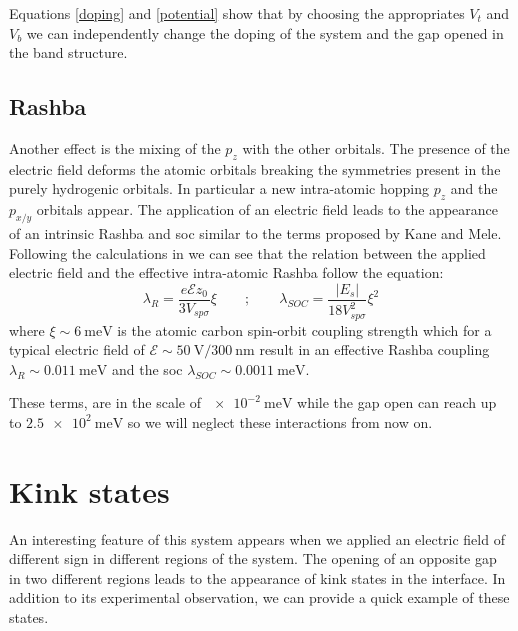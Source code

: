 Equations \eqref{doping} and \eqref{potential} show that by choosing the        appropriates $V_t$ and $V_b$ we can independently change the doping of the      system and the gap opened in the band structure.





\subsection{Rashba}
Another effect is the mixing of the $p_z$ with the other orbitals. The presence of the electric field deforms the atomic orbitals breaking the symmetries present in the purely hydrogenic orbitals. In particular a new intra-atomic hopping $p_z$ and the $p_{x/y}$ orbitals appear. The application of an electric field leads to the appearance of an intrinsic Rashba and \ac{soc} similar to the terms proposed by Kane and Mele\cite{Kane2005}.
Following the calculations in %
\cite{Min2006} we can see that the relation between the applied electric field and the effective intra-atomic Rashba follow the equation:
\begin{equation}
   \lambda_R=\frac{e\mathcal{E}z_0}{3V_{sp\sigma}}\xi \qquad;\qquad
   \lambda_{SOC}=\frac{|E_{s}|}{18V^2_{sp\sigma}}\xi^2
\label{rashba}
\end{equation}
where $\xi\sim\SI{6}{\meV}$ is the atomic carbon spin-orbit coupling strength
which for a typical electric field of $\mathcal{E}\sim\SI{50}{\V}/\SI{300}{\nm}$ result in an effective Rashba coupling $\lambda_R\sim\SI{0.011}{\meV}$ and the \ac{soc} $\lambda_{SOC}\sim\SI{0.0011}{\meV}$.

These terms, are in the scale of $\SI{e-2}{\meV}$ while the gap open can reach up to $\SI{2.5e2}{\meV}$ so we will neglect these interactions from now on.


\section{Kink states}
An interesting feature of this system appears when we applied an electric field of different sign in different regions of the system\cite{Martin2008,Jung2011,Yin2016,Li2016,Li2018b}. The opening of an opposite gap in two different regions leads to the appearance of kink states in the interface. In addition to its experimental observation\cite{Li2016}, we can provide a quick example of these states.

